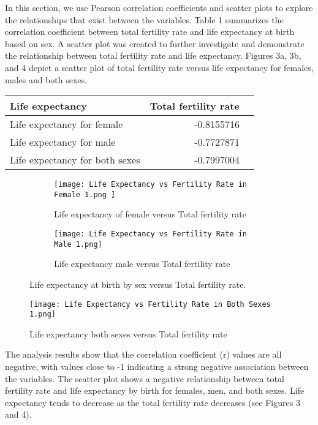 \documentclass[12 pt]{scrartcl}
\begin{document}
In this section, we use Pearson correlation coefficients and scatter plots to explore the relationships that exist between the variables. Table 1 summarizes the correlation coefficient between total fertility rate and life expectancy at birth based on sex. A scatter plot was created to further investigate and demonstrate the relationship between total fertility rate and life expectancy. Figures 3a, 3b, and 4 depict a scatter plot of total fertility rate versus life expectancy for females, males and both sexes.
\begin{table}[ht]
\centering
{}
\label{tab:values}
\begin{tabular}{l|rr}
Life expectancy & Total fertility rate \\
\hline
Life expectancy for female & -0.8155716 &  \\
Life expectancy for male & -0.7727871 &  \\
Life expectancy for both sexes & -0.7997004 & 
\end{tabular}
\end{table}
\begin{figure}[h!]
	\centering
	\begin{subfigure}[h]{0.49\textwidth}
	\centering
	\texttt{[image: Life Expectancy vs Fertility Rate in Female 1.png ]}
	\caption{Life expectancy of female versus Total fertility rate}
	\label{fig:scat_both}
	\end{subfigure}
	\hfill
	\begin{subfigure}[h]{0.49\textwidth}
	\centering
	\texttt{[image: Life Expectancy vs Fertility Rate in Male 1.png]}
	\caption{Life expectancy male versus Total fertility rate}
	\label{fig:scat_male}
\end{subfigure}
 \caption{Life expectancy at birth by sex versus Total fertility rate.}
\label{fig:two_scatterplot}
\end{figure}

\begin{figure}[h!]
	\centering
	\texttt{[image: Life Expectancy vs Fertility Rate in Both Sexes 1.png]}
	\caption{Life expectancy both sexes versus Total fertility rate}
	\label{fig:scat_female}
\end{figure}

The analysis results show that the correlation coefficient (r) values are all negative, with values close to -1 indicating a strong negative association between the variables. The scatter plot shows a negative relationship between total fertility rate and life expectancy by birth for females, men, and both sexes. Life expectancy tends to decrease as the total fertility rate decreases (see Figures 3 and 4).
\end{document}
